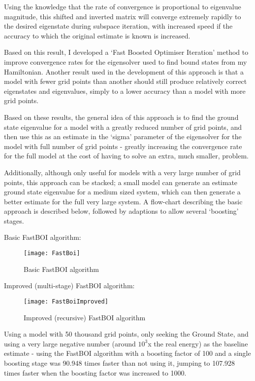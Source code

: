 Using the knowledge that the rate of convergence is proportional to eigenvalue magnitude, this shifted and inverted matrix will converge extremely rapidly to the desired eigenstate during subspace iteration, with increased speed if the accuracy to which the original estimate is known is increased.

Based on this result, I developed a `Fast Boosted Optimiser Iteration' method to improve convergence rates for the eigensolver used to find bound states from my Hamiltonian. Another result used in the development of this approach is that a model with fewer grid points than another should still produce relatively correct eigenstates and eigenvalues, simply to a lower accuracy than a model with more grid points. 

Based on these results, the general idea of this approach is to find the ground state eigenvalue for a model with a greatly reduced number of grid points, and then use this as an estimate in the `sigma' parameter of the eigensolver for the model with full number of grid points - greatly increasing the convergence rate for the full model at the cost of having to solve an extra, much smaller, problem. 

Additionally, although only useful for models with a very large number of grid points, this approach can be stacked; a small model can generate an estimate ground state eigenvalue for a medium sized system, which can then generate a better estimate for the full very large system. A flow-chart describing the basic approach is described below, followed by adaptions to allow several `boosting' stages.

Basic FastBOI algorithm:

\begin{figure}[!htb]
	\texttt{[image: FastBoi]}
	\centering
	\caption{Basic FastBOI algorithm}
\end{figure}

Improved (multi-stage) FastBOI algorithm:
\begin{figure}[!htb]
	\texttt{[image: FastBoiImproved]}
	\centering
	\caption{Improved (recursive) FastBOI algorithm}
\end{figure}

Using a model with 50 thousand grid points, only seeking the Ground State, and using a very large negative number (around $10^{3}$x the real energy) as the baseline estimate - using the FastBOI algorithm with a boosting factor of 100 and a single boosting stage was 90.948 times faster than not using it, jumping to 107.928 times faster when the boosting factor was increased to 1000. 


